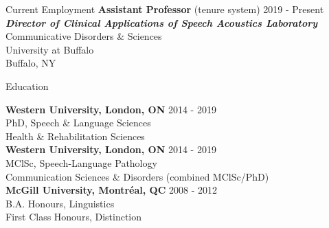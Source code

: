 \documentclass{resume} %
\begin{document}

\begin{flushleft}
  \hfill
\end{flushleft}







\begin{rSection}{Current Employment}
{{\bf Assistant Professor} (tenure system)} \hfill {2019 - Present} \\
\emph{\bf{Director of Clinical Applications of Speech Acoustics Laboratory}}\\
Communicative Disorders \& Sciences \\
University at Buffalo \\
Buffalo, NY

\end{rSection}

\begin{rSection}{Education}

{\bf Western University, London, ON} \hfill {2014 - 2019} \\ 
PhD, Speech \& Language Sciences  \\
Health \& Rehabilitation Sciences \bigskip \\

{\bf Western University, London, ON} \hfill {2014 - 2019} \\ 
MClSc, Speech-Language Pathology  \\
Communication Sciences \& Disorders (combined MClSc/PhD) \bigskip \\

{\bf McGill University, Montr\'eal, QC} \hfill {2008 - 2012} \\
B.A. Honours, Linguistics \\
First Class Honours, Distinction

\end{rSection}
\end{document}
